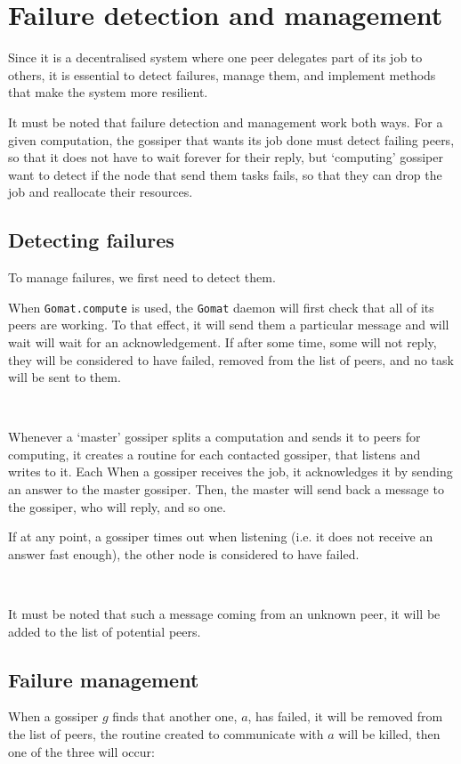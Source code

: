 \documentclass[a4paper,12pt]{article}
\newcommand{\Gomat}{\texttt{Gomat}\xspace}
\begin{document}
    \section{Failure detection and management}
    Since it is a decentralised system where one peer delegates part of its job to others, it is essential to detect failures, manage them, and implement methods that make the system more resilient.

    It must be noted that failure detection and management work both ways. For a given computation, the gossiper that wants its job done must detect failing peers, so that it does not have to wait forever for their reply, but ‘computing’ gossiper want to detect if the node that send them tasks fails, so that they can drop the job and reallocate their resources.


    \subsection{Detecting failures}
    To manage failures, we first need to detect them.

    When \texttt{Gomat.compute} is used, the \Gomat daemon will first check that all of its peers are working. To that effect, it will send them a particular message and will wait will wait for an acknowledgement. If after some time, some will not reply, they will be considered to have failed, removed from the list of peers, and no task will be sent to them.

~~

    Whenever a ‘master’ gossiper splits a computation and sends it to peers for computing, it creates a routine for each contacted gossiper, that listens and writes to it. Each
When a gossiper receives the job, it acknowledges it by sending an answer to the master gossiper.
Then, the master will send back a message to the gossiper, who will reply, and so one.

    If at any point, a gossiper times out when listening (i.e. it does not receive an answer fast enough), the other node is considered to have failed.

~~

    It must be noted that such a message coming from an unknown peer, it will be added to the list of potential peers.

    \subsection{Failure management}
    When a gossiper $g$ finds that another one, $a$, has failed, it will be removed from the list of peers, the routine created to communicate with $a$ will be killed, then one of the three will occur:
\end{document}
